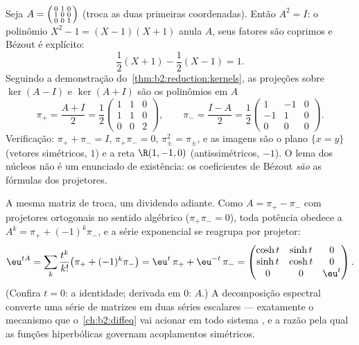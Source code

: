 \begin{example}\label{ex:b2:reduction:projectorswork}
Seja $A = \begin{psmallmatrix}0 & 1 & 0\\ 1 & 0 & 0\\ 0 & 0 &
1\end{psmallmatrix}$ (troca as duas primeiras coordenadas). Então $A^2
= I$: o polinômio $X^2 - 1 = (X - 1)(X + 1)$ anula $A$,
seus fatores são coprimos e Bézout é explícito:
\[
\frac{1}{2}(X + 1) - \frac12(X - 1) = 1 .
\]
Seguindo a demonstração do~\cref{thm:b2:reduction:kernels}, as
projeções sobre $\ker(A - I)$ e $\ker(A + I)$ são os
polinômios em $A$
\[
\pi_+ = \frac{A + I}{2} = \frac12\begin{pmatrix}
1 & 1 & 0\\ 1 & 1 & 0\\ 0 & 0 & 2\end{pmatrix},
\qquad
\pi_- = \frac{I - A}{2} = \frac12\begin{pmatrix}
1 & -1 & 0\\ -1 & 1 & 0\\ 0 & 0 & 0\end{pmatrix}.
\]
Verificação: $\pi_+ + \pi_- = I$, $\pi_+\pi_- = 0$, $\pi_\pm^2 =
\pi_\pm$, e as imagens são o plano $\{x = y\}$ (vetores
simétricos,  $1$) e a reta $\R(1, -1, 0)$
(antissimétricos,  $-1$). O lema dos núcleos não é um
enunciado de existência: os coeficientes de Bézout \emph{são} as
fórmulas dos projetores.
\end{example}

\begin{example}\label{ex:b2:reduction:expprojectors}
A mesma matriz de troca, um dividendo adiante. Como $A = \pi_+ -
\pi_-$ com projetores ortogonais no sentido algébrico
($\pi_+\pi_- = 0$), toda potência obedece a $A^k = \pi_+ +
(-1)^k\pi_-$, e a série exponencial se reagrupa por projetor:
\[
\eu^{tA} = \sum_k \frac{t^k}{k!}\bigl(\pi_+ +
(-1)^k\pi_-\bigr)
= \eu^{t}\,\pi_+ + \eu^{-t}\,\pi_- =
\begin{pmatrix}
\cosh t & \sinh t & 0\\
\sinh t & \cosh t & 0\\
0 & 0 & \eu^{t}
\end{pmatrix}.
\]
(Confira $t = 0$: a identidade; derivada em $0$: $A$.) A
decomposição espectral converte uma série de matrizes em duas séries
escalares --- exatamente o mecanismo que o~\cref{ch:b2:diffeq} vai
acionar em todo sistema , e a razão pela qual as funções
hiperbólicas governam acoplamentos simétricos.
\end{example}

